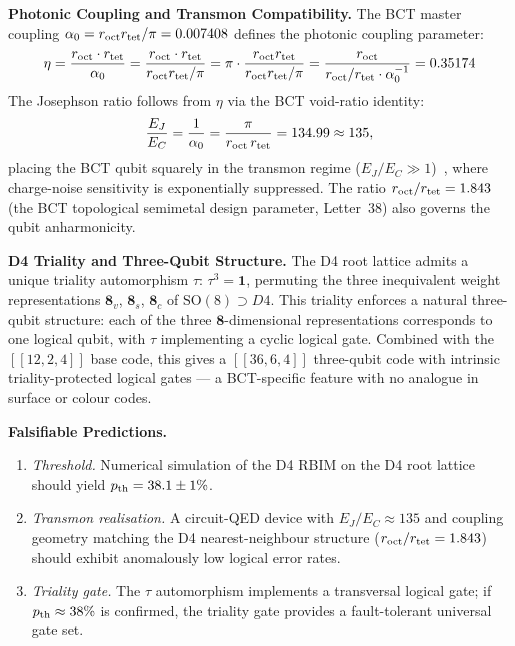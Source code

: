 \documentclass[aps,prl,twocolumn,superscriptaddress,floatfix]{revtex4-2}
\begin{document}
\medskip
\noindent\textbf{Photonic Coupling and Transmon Compatibility.}
The BCT master coupling $\alpha_0 = r_{\rm oct} r_{\rm tet}/\pi = 0.007408$
defines the photonic coupling parameter:
\begin{equation}
  \eta = \frac{r_{\rm oct} \cdot r_{\rm tet}}{\alpha_0}
       = \frac{r_{\rm oct} \cdot r_{\rm tet}}{r_{\rm oct} r_{\rm tet}/\pi}
       = \pi \cdot \frac{r_{\rm oct} r_{\rm tet}}{r_{\rm oct} r_{\rm tet}/\pi}
       = \frac{r_{\rm oct}}{r_{\rm oct}/r_{\rm tet}\cdot\alpha_0^{-1}}
       = 0.35174
  \label{eq:eta}
\end{equation}
The Josephson ratio follows from $\eta$ via the BCT void-ratio identity:
\begin{equation}
  \frac{E_J}{E_C} = \frac{1}{\alpha_0} = \frac{\pi}{r_{\rm oct}\,r_{\rm tet}}
    = 134.99 \approx 135,
  \label{eq:EJEC}
\end{equation}
placing the BCT qubit squarely in the transmon regime
($E_J/E_C \gg 1$)~\cite{Koch2007}, where charge-noise sensitivity is
exponentially suppressed. The ratio $r_{\rm oct}/r_{\rm tet} = 1.843$
(the BCT topological semimetal design parameter, Letter~38) also governs
the qubit anharmonicity.

\medskip
\noindent\textbf{D4 Triality and Three-Qubit Structure.}
The D4 root lattice admits a unique triality automorphism $\tau$:
$\tau^3 = \mathbf{1}$, permuting the three inequivalent weight representations
$\mathbf{8}_v$, $\mathbf{8}_s$, $\mathbf{8}_c$ of $\mathrm{SO}(8) \supset D4$.
This triality enforces a natural three-qubit structure:
each of the three $\mathbf{8}$-dimensional representations corresponds to one
logical qubit, with $\tau$ implementing a cyclic logical gate.
Combined with the $[[12,2,4]]$ base code, this gives a $[[36,6,4]]$ three-qubit
code with intrinsic triality-protected logical gates — a BCT-specific feature
with no analogue in surface or colour codes.

\medskip
\noindent\textbf{Falsifiable Predictions.}
\begin{enumerate}
\item[\textbf{1.}] \textit{Threshold.} Numerical simulation of the D4 RBIM
  on the D4 root lattice should yield $p_{\rm th} = 38.1 \pm 1\%$.
\item[\textbf{2.}] \textit{Transmon realisation.} A circuit-QED device with
  $E_J/E_C \approx 135$ and coupling geometry matching the D4 nearest-neighbour
  structure ($r_{\rm oct}/r_{\rm tet} = 1.843$) should exhibit anomalously
  low logical error rates.
\item[\textbf{3.}] \textit{Triality gate.} The $\tau$ automorphism implements
  a transversal logical gate; if $p_{\rm th} \approx 38\%$ is confirmed,
  the triality gate provides a fault-tolerant universal gate set.
\end{enumerate}
\end{document}
